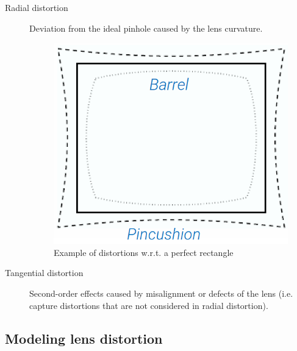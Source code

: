 \begin{description}
    \item[Radial distortion] 
        Deviation from the ideal pinhole caused by the lens curvature.


        \begin{figure}[H]
            \centering
            \includegraphics[width=0.25\linewidth]{./img/radial_distortion.png}
            \caption{Example of distortions w.r.t. a perfect rectangle}
        \end{figure}

    \item[Tangential distortion]
        Second-order effects caused by misalignment or defects of the lens (i.e. capture distortions that are not considered in radial distortion).
\end{description}


\subsection{Modeling lens distortion}

